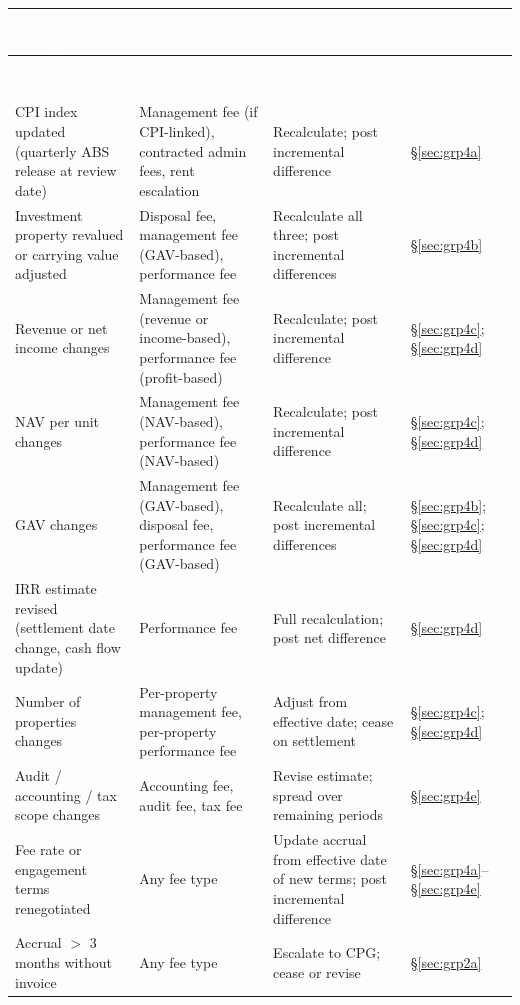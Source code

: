 \documentclass[10pt,a4paper]{article}
\begin{document}
{\small\sffamily
\begin{longtable}{@{} L{3.8cm} L{2.2cm} L{2.8cm} L{3.9cm} @{}}
\textcolor{white}{\bfseries What Changed?} & \textcolor{white}{\bfseries Fee Types Affected} & \textcolor{white}{\bfseries Action} & \textcolor{white}{\bfseries Reference} \\
\midrule
\endfirsthead
{}
\textcolor{white}{\bfseries What Changed?} & \textcolor{white}{\bfseries Fee Types Affected} & \textcolor{white}{\bfseries Action} & \textcolor{white}{\bfseries Reference} \\
\midrule
\endhead
CPI index updated (quarterly ABS release at review date) & Management fee (if CPI-linked), contracted admin fees, rent escalation & Recalculate; post incremental difference & \S\ref{sec:grp4a} \\
Investment property revalued or carrying value adjusted & Disposal fee, management fee (GAV-based), performance fee & Recalculate all three; post incremental differences & \S\ref{sec:grp4b} \\
Revenue or net income changes & Management fee (revenue or income-based), performance fee (profit-based) & Recalculate; post incremental difference & \S\ref{sec:grp4c}; \S\ref{sec:grp4d} \\
NAV per unit changes & Management fee (NAV-based), performance fee (NAV-based) & Recalculate; post incremental difference & \S\ref{sec:grp4c}; \S\ref{sec:grp4d} \\
GAV changes & Management fee (GAV-based), disposal fee, performance fee (GAV-based) & Recalculate all; post incremental differences & \S\ref{sec:grp4b}; \S\ref{sec:grp4c}; \S\ref{sec:grp4d} \\
IRR estimate revised (settlement date change, cash flow update) & Performance fee & Full recalculation; post net difference & \S\ref{sec:grp4d} \\
Number of properties changes & Per-property management fee, per-property performance fee & Adjust from effective date; cease on settlement & \S\ref{sec:grp4c}; \S\ref{sec:grp4d} \\
Audit / accounting / tax scope changes & Accounting fee, audit fee, tax fee & Revise estimate; spread over remaining periods & \S\ref{sec:grp4e} \\
Fee rate or engagement terms renegotiated & Any fee type & Update accrual from effective date of new terms; post incremental difference & \S\ref{sec:grp4a}--\S\ref{sec:grp4e} \\
Accrual $>$ 3 months without invoice & Any fee type & Escalate to CPG; cease or revise & \S\ref{sec:grp2a} \\
\bottomrule
\end{longtable}}
\end{document}
